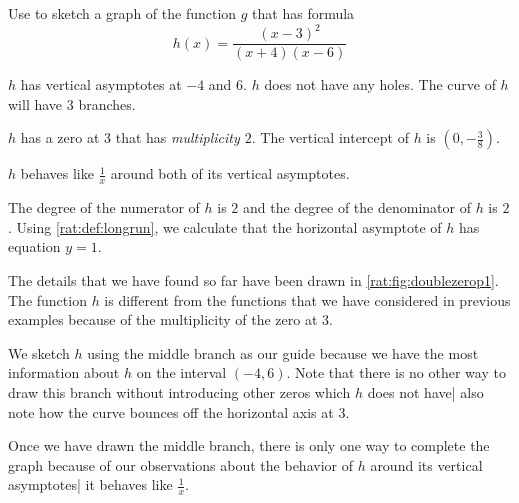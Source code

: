  \begin{pccexample}\label{rat:ex:doublezero}
	 Use  to sketch a graph of the function $g$
	 that has formula
	 \[
		 h(x)=\frac{(x-3)^2}{(x+4)(x-6)}
	 \]
	 \begin{pccsolution}
		 \begin{steps}
			 \item $h$ has vertical asymptotes at $-4$ and $6$. $h$ does
			 not have any holes. The curve of $h$ will have $3$ branches.
			 \item $h$ has a zero at $3$ that has \emph{multiplicity $2$}.
			 The vertical intercept of $h$ is
			 $\left( 0,-\frac{3}{8} \right)$.
			 \item $h$ behaves like $\frac{1}{x}$ around both of its
			 vertical asymptotes.
			 \item The degree of the numerator of $h$ is $2$ and the degree of the denominator
			 of $h$ is $2$. Using \vref{rat:def:longrun}, we calculate that
			 the horizontal asymptote of $h$ has equation $y=1$.
			 \item The details that we have found so far have been drawn in
			 \cref{rat:fig:doublezerop1}. The function $h$ is different
			 from the functions that we have considered in previous examples because
			 of the multiplicity of the zero at $3$.

			 We sketch $h$ using the middle branch as our guide because we have the most information
			 about $h$ on the interval $(-4,6)$. Note that there is no other way to draw this branch
			 without introducing other zeros which $h$ does not have| also note how
			 the curve bounces off the horizontal axis at $3$.

			 Once we have drawn the middle branch, there is only one way to complete the graph
			 because of our observations about the behavior of $h$ around its vertical asymptotes| it
			 behaves like $\frac{1}{x}$.

		 \end{steps}
	 \end{pccsolution}
 \end{pccexample}

